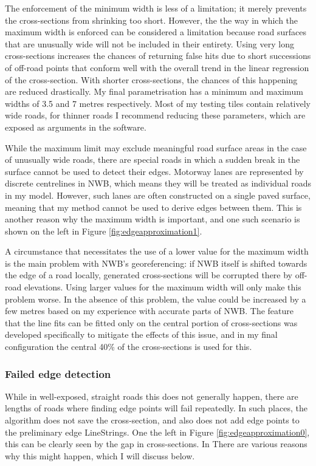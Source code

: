 The enforcement of the minimum width is less of a limitation; it merely prevents the cross-sections from shrinking too short. However, the the way in which the maximum width is enforced can be considered a limitation because road surfaces that are unusually wide will not be included in their entirety. Using very long cross-sections increases the chances of returning false hits due to short successions of off-road points that conform well with the overall trend in the linear regression of the cross-section. With shorter cross-sections, the chances of this happening are reduced drastically. My final parametrisation has a minimum and maximum widths of 3.5 and 7 metres respectively. Most of my testing tiles contain relatively wide roads, for thinner roads I recommend reducing these parameters, which are exposed as arguments in the software.

While the maximum limit may exclude meaningful road surface areas in the case of unusually wide roads, there are special roads in which a sudden break in the surface cannot be used to detect their edges. Motorway lanes are represented by discrete centrelines in NWB, which means they will be treated as individual roads in my model. However, such lanes are often constructed on a single paved surface, meaning that my method cannot be used to derive edges between them. This is another reason why the maximum width is important, and one such scenario is shown on the left in Figure \ref{fig:edgeapproximation1}.

A circumstance that necessitates the use of a lower value for the maximum width is the main problem with NWB's georeferencing: if NWB itself is shifted towards the edge of a road locally, generated cross-sections will be corrupted there by off-road elevations. Using larger values for the maximum width will only make this problem worse. In the absence of this problem, the value could be increased by a few metres based on my experience with accurate parts of NWB. The feature that the line fits can be fitted only on the central portion of cross-sections was developed specifically to mitigate the effects of this issue, and in my final configuration the central 40\% of the cross-sections is used for this.

\subsubsection{Failed edge detection}

While in well-exposed, straight roads this does not generally happen, there are lengths of roads where finding edge points will fail repeatedly. In such places, the algorithm does not save the cross-section, and also does not add edge points to the preliminary edge LineStrings. One the left in Figure \ref{fig:edgeapproximation0}, this can be clearly seen by the gap in cross-sections. In There are various reasons why this might happen, which I will discuss below.

